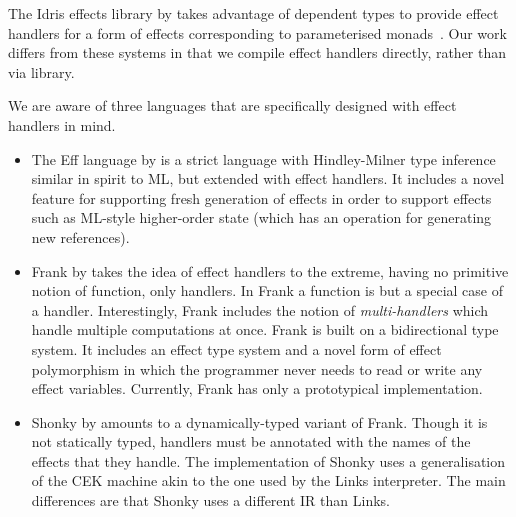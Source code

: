 \documentclass[12pt,mscres,cdtppar,twoside,openright,logo,rightchapter,normalheadings]{infthesis}
\theoremstyle{definition}
\begin{document}
The Idris effects library by \cite{Brady2013} takes advantage of
dependent types to provide effect handlers for a form of effects
corresponding to parameterised monads~\citep{Atkey09}.
%
Our work differs from these systems in that we compile effect handlers
directly, rather than via library.

We are aware of three languages that are specifically designed with
effect handlers in mind.
%
\begin{itemize}
\item The Eff language by \cite{Bauer2015} is a strict language with
  Hindley-Milner type inference similar in spirit to ML, but extended
  with effect handlers.
%
It includes a novel feature for supporting fresh generation of effects
in order to support effects such as ML-style higher-order state (which
has an operation for generating new references).
%

\item Frank by \cite{Lindley2016} takes the idea of effect handlers to
  the extreme, having no primitive notion of function, only
  handlers. In Frank a function is but a special case of a
  handler. Interestingly, Frank includes the notion of
  \emph{multi-handlers} which handle multiple computations at
  once. Frank is built on a bidirectional type system. It includes an
  effect type system and a novel form of effect polymorphism in which
  the programmer never needs to read or write any effect
  variables. Currently, Frank has only a prototypical implementation.

\item Shonky by \cite{McBride2016} amounts to a dynamically-typed
  variant of Frank. Though it is not statically typed, handlers must
  be annotated with the names of the effects that they handle. The
  implementation of Shonky uses a generalisation of the CEK machine
  akin to the one used by the Links interpreter. The main differences
  are that Shonky uses a different IR than Links. 
\end{itemize}
\end{document}
